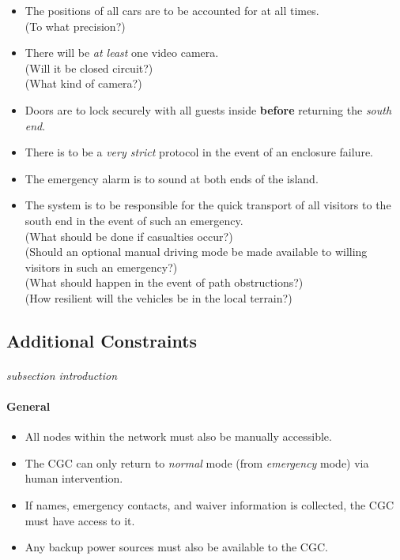 \documentclass[12pt]{article}
\begin{document}
\begin{itemize}
		\item The positions of all cars are to be accounted for at all times. 
		\\(To what precision?)
		\item There will be \textit{at least} one video camera. 
		\\(Will it be closed circuit?) 
		\\(What kind of camera?)
		\item Doors are to lock securely with all guests inside \textbf{before} returning the \textit{south end}.
		\item There is to be a \textit{very strict} protocol in the event of an enclosure failure.
		\item The emergency alarm is to sound at both ends of the island.
		\item The system is to be responsible for the quick transport of all visitors to the south end in the event of such an emergency.
		\\(What should be done if casualties occur?)
		\\(Should an optional manual driving mode be made available to willing visitors in such an emergency?)
		\\(What should happen in the event of path obstructions?)
		\\(How resilient will the vehicles be in the local terrain?) 
	\end{itemize}
	\subsection{Additional Constraints}
	\paragraph{} \textit{subsection introduction}
	\paragraph{General}
	\begin{itemize}
		\item[] All nodes within the network must also be manually accessible.
		\item[] The CGC can only return to \textit{normal} mode (from \textit{emergency} mode) via human intervention.
		\item[] If names, emergency contacts, and waiver information is collected, the CGC must have access to it.
		\item[] Any backup power sources must also be available to the CGC.
	\end{itemize}
	
\end{document}
